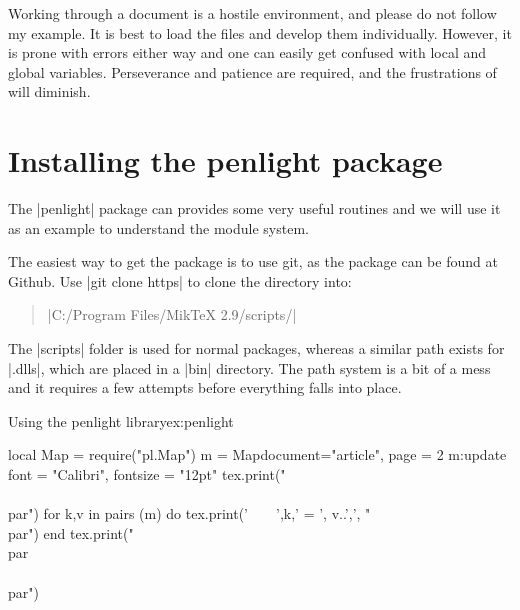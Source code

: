 %
%

Working through a document is a hostile environment, and please do not follow my example. It is best to
load the files and develop them individually. However, it is prone with errors either way and one can easily get confused with local and global variables. Perseverance and patience are required, and the frustrations of \tex will diminish.





\section{Installing the penlight package}

The |penlight| package can provides some very useful routines and we will use it as an example
to understand the module system.

The easiest way to get the package is to use git, as the package can be found at Github. Use |git clone https|  to clone the directory into: 

\begin{quote}
|C:/Program Files/MikTeX 2.9/scripts/| 
\end{quote}

The |scripts| folder is used for normal packages, whereas a similar path exists for |.dlls|, which are placed in a |bin| directory. The path system is a bit of a mess and it requires a few attempts before everything falls into place. 

\begin{texexample}{Using the penlight library}{ex:penlight}
\begin{luacode}
local Map = require("pl.Map")
       m = Map{document="article", 
                     page = 2}
       m:update {font = "Calibri", fontsize = "12pt"}               
       tex.print("\\{\\par")
       for k,v in pairs (m)  do
           tex.print('~~~~',k,' = ', v..',', "\\par")
       end   
       tex.print("\\par\\}\\par") 
\end{luacode}
\end{texexample}


